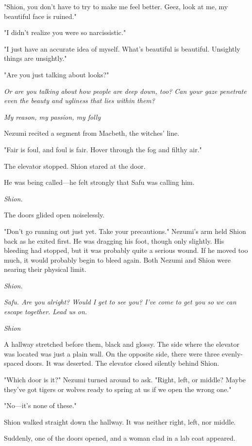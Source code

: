 "Shion, you don't have to try to make me feel better. Geez, look at me,
my beautiful face is ruined."

"I didn't realize you were so narcissistic."

"I just have an accurate idea of myself. What's beautiful is beautiful.
Unsightly things are unsightly."

"Are you just talking about looks?"

\emph{Or are you talking about how people are deep down, too? Can your gaze
penetrate even the beauty and ugliness that lies within them?}

\emph{My reason, my passion, my folly\el }

Nezumi recited a segment from Macbeth, the witches' line.

"Fair is foul, and foul is fair. Hover through the fog and filthy air."

The elevator stopped. Shion stared at the door.

He was being called---he felt strongly that Safu was calling him.

\emph{Shion.}

The doors glided open noiselessly.

"Don't go running out just yet. Take your precautions." Nezumi's arm
held Shion back as he exited first. He was dragging his foot, though
only slightly. His bleeding had stopped, but it was probably quite a
serious wound. If he moved too much, it would probably begin to bleed
again. Both Nezumi and Shion were nearing their physical limit.

\emph{Shion.}

\emph{Safu. Are you alright? Would I get to see you? I've come to get you so
we can escape together. Lead us on.}

\emph{Shion\el }

A hallway stretched before them, black and glossy. The side where the
elevator was located was just a plain wall. On the opposite side, there
were three evenly-spaced doors. It was deserted. The elevator closed
silently behind Shion.

"Which door is it?" Nezumi turned around to ask. "Right, left, or
middle? Maybe they've got tigers or wolves ready to spring at us if we
open the wrong one."

"No---it's none of these."

Shion walked straight down the hallway. It was neither right, left, nor
middle.

Suddenly, one of the doors opened, and a woman clad in a lab coat
appeared.

